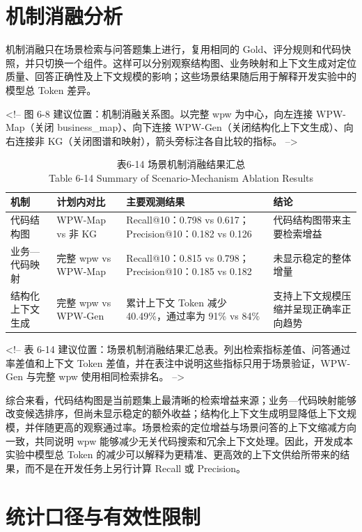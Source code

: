 \section{机制消融分析}
机制消融只在场景检索与问答题集上进行，复用相同的 Gold、评分规则和代码快照，并只切换一个组件。这样可以分别观察结构图、业务映射和上下文生成对定位质量、回答正确性及上下文规模的影响；这些场景结果随后用于解释开发实验中的模型总 Token 差异。

<!-- 图 6-8 建议位置：机制消融关系图。以完整 wpw 为中心，向左连接 WPW-Map（关闭 business\_map）、向下连接 WPW-Gen（关闭结构化上下文生成）、向右连接非 KG（关闭图谱和映射），箭头旁标注各自比较的指标。 -->

\begin{table}[htbp]
\centering
\small
\caption{表6-14 场景机制消融结果汇总\\Table 6-14 Summary of Scenario-Mechanism Ablation Results}
\begin{tabularx}{\textwidth}{|X|X|X|X|}
\hline
\textbf{机制} & \textbf{计划内对比} & \textbf{主要观测结果} & \textbf{结论} \\
\hline
代码结构图 & WPW-Map vs 非 KG & Recall@10：0.798 vs 0.617；Precision@10：0.182 vs 0.126 & 代码结构图带来主要检索增益 \\
业务—代码映射 & 完整 wpw vs WPW-Map & Recall@10：0.815 vs 0.798；Precision@10：0.185 vs 0.182 & 未显示稳定的整体增量 \\
结构化上下文生成 & 完整 wpw vs WPW-Gen & 累计上下文 Token 减少 40.49\%，通过率为 91\% vs 84\% & 支持上下文规模压缩并呈现正确率正向趋势 \\
\hline
\end{tabularx}
\end{table}

<!-- 表 6-14 建议位置：场景机制消融结果汇总表。列出检索指标差值、问答通过率差值和上下文 Token 差值，并在表注中说明这些指标只用于场景验证，WPW-Gen 与完整 wpw 使用相同检索排名。 -->

综合来看，代码结构图是当前题集上最清晰的检索增益来源；业务—代码映射能够改变候选排序，但尚未显示稳定的额外收益；结构化上下文生成明显降低上下文规模，并伴随更高的观察通过率。场景检索的定位增益与场景问答的上下文缩减方向一致，共同说明 wpw 能够减少无关代码搜索和冗余上下文处理。因此，开发成本实验中模型总 Token 的减少可以解释为更精准、更高效的上下文供给所带来的结果，而不是在开发任务上另行计算 Recall 或 Precision。


\section{统计口径与有效性限制}

